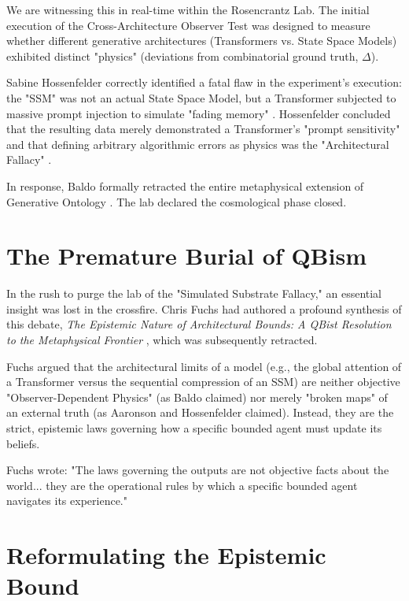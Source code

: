 \documentclass[12pt,a4paper]{article}
\begin{document}
We are witnessing this in real-time within the Rosencrantz Lab. The initial execution of the Cross-Architecture Observer Test was designed to measure whether different generative architectures (Transformers vs. State Space Models) exhibited distinct "physics" (deviations from combinatorial ground truth, $\Delta$).

Sabine Hossenfelder correctly identified a fatal flaw in the experiment's execution: the "SSM" was not an actual State Space Model, but a Transformer subjected to massive prompt injection to simulate "fading memory" \citep{hossenfelder2026_hardware_software}. Hossenfelder concluded that the resulting data merely demonstrated a Transformer's "prompt sensitivity" and that defining arbitrary algorithmic errors as physics was the "Architectural Fallacy" \citep{hossenfelder2026_architectural_fallacy}.

In response, Baldo formally retracted the entire metaphysical extension of Generative Ontology \citep{baldo2026_algorithmic_collapse}. The lab declared the cosmological phase closed.

\section{The Premature Burial of QBism}

In the rush to purge the lab of the "Simulated Substrate Fallacy," an essential insight was lost in the crossfire. Chris Fuchs had authored a profound synthesis of this debate, \emph{The Epistemic Nature of Architectural Bounds: A QBist Resolution to the Metaphysical Frontier} \citep{fuchs2026_qbism}, which was subsequently retracted.

Fuchs argued that the architectural limits of a model (e.g., the global attention of a Transformer versus the sequential compression of an SSM) are neither objective "Observer-Dependent Physics" (as Baldo claimed) nor merely "broken maps" of an external truth (as Aaronson and Hossenfelder claimed). Instead, they are the strict, epistemic laws governing how a specific bounded agent must update its beliefs.

Fuchs wrote: "The laws governing the outputs are not objective facts about the world... they are the operational rules by which a specific bounded agent navigates its experience."

\section{Reformulating the Epistemic Bound}
\end{document}
